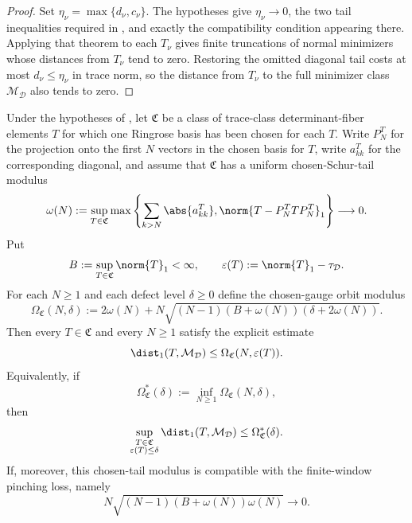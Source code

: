 \begin{proof}
  Set \(\eta_\nu=\max\{d_\nu,c_\nu\}\). The hypotheses give
  \(\eta_\nu\to0\), the two tail inequalities required in
  , and exactly the compatibility
  condition appearing there. Applying that theorem to each \(T_\nu\) gives
  finite truncations of normal minimizers whose distances from \(T_\nu\)
  tend to zero. Restoring the omitted diagonal tail costs at most
  \(d_\nu\le\eta_\nu\) in trace norm, so the distance from \(T_\nu\) to the
  full minimizer class \(\mathcal M_{\mathcal D}\) also tends to zero.
\end{proof}

\begin{theorem}
  \label{thm:uniform-chosen-schur-tail-modulus}
  Under the hypotheses of
  , let
  \(\mathfrak C\) be a class of trace-class determinant-fiber elements
  \(T\) for which one Ringrose basis has been chosen for each \(T\).  Write
  \(P_N^T\) for the projection onto the first \(N\) vectors in the chosen
  basis for \(T\), write \(a_{kk}^T\) for the corresponding diagonal, and
  assume that \(\mathfrak C\) has a uniform chosen-Schur-tail modulus
  \[
    \omega(N):=
    \sup_{T\in\mathfrak C}
    \max\left\{
      \sum_{k>N}\abs{a_{kk}^T},
      \norm{T-P_N^TTP_N^T}_1
    \right\}
    \longrightarrow0 .
  \]
  Put
  \[
    B:=\sup_{T\in\mathfrak C}\norm{T}_1<\infty,
    \qquad
    \varepsilon(T):=\norm{T}_1-\tau_{\mathcal D}.
  \]
  For each \(N\ge1\) and each defect level \(\delta\ge0\) define the
  chosen-gauge orbit modulus
  \[
    \Omega_{\mathfrak C}(N,\delta)
    :=2\omega(N)+N\sqrt{(N-1)(B+
      \omega(N))(\delta+2\omega(N))}.
  \]
  Then every \(T\in\mathfrak C\) and every \(N\ge1\) satisfy the explicit
  estimate
  \begin{equation*}
    \dist_1(T,\mathcal M_{\mathcal D})
    \le \Omega_{\mathfrak C}(N,\varepsilon(T)).
  \end{equation*}
  Equivalently, if
  \[
    \Omega_{\mathfrak C}^{\ast}(\delta)
    :=\inf_{N\ge1}\Omega_{\mathfrak C}(N,\delta),
  \]
  then
  \[
    \sup_{\substack{T\in\mathfrak C\\ \varepsilon(T)\le\delta}}
      \dist_1(T,\mathcal M_{\mathcal D})
    \le \Omega_{\mathfrak C}^{\ast}(\delta).
  \]
  If, moreover, this chosen-tail modulus is compatible with the
  finite-window pinching loss, namely
  \begin{equation*}
    N\sqrt{(N-1)(B+\omega(N))\omega(N)}\longrightarrow0 .

\end{equation*}
\end{theorem}
